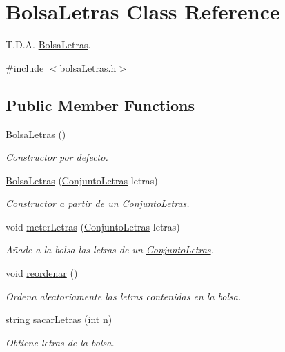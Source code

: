\hypertarget{classBolsaLetras}{}\section{Bolsa\+Letras Class Reference}
\label{classBolsaLetras}


T.\+D.\+A. \mbox{\hyperlink{classBolsaLetras}{Bolsa\+Letras}}.  




{\ttfamily \#include $<$bolsa\+Letras.\+h$>$}

\subsection*{Public Member Functions}
\begin{DoxyCompactItemize}
\item 
\mbox{\label{classBolsaLetras_a2e269014b3a51359195e7b288a4b37c6}} 
\mbox{\hyperlink{classBolsaLetras_a2e269014b3a51359195e7b288a4b37c6}{Bolsa\+Letras}} ()
\begin{DoxyCompactList}\small\item\em Constructor por defecto. \end{DoxyCompactList}\item 
\mbox{\hyperlink{classBolsaLetras_a714c83912cf268e7ee8305eb641bf976}{Bolsa\+Letras}} (\mbox{\hyperlink{classConjuntoLetras}{Conjunto\+Letras}} letras)
\begin{DoxyCompactList}\small\item\em Constructor a partir de un \mbox{\hyperlink{classConjuntoLetras}{Conjunto\+Letras}}. \end{DoxyCompactList}\item 
void \mbox{\hyperlink{classBolsaLetras_ae324c593294fa22e0b4e6f5cc6ecca99}{meter\+Letras}} (\mbox{\hyperlink{classConjuntoLetras}{Conjunto\+Letras}} letras)
\begin{DoxyCompactList}\small\item\em Añade a la bolsa las letras de un \mbox{\hyperlink{classConjuntoLetras}{Conjunto\+Letras}}. \end{DoxyCompactList}\item 
\mbox{\label{classBolsaLetras_a024246bb2bea79846aee3d4d0a7b4362}} 
void \mbox{\hyperlink{classBolsaLetras_a024246bb2bea79846aee3d4d0a7b4362}{reordenar}} ()
\begin{DoxyCompactList}\small\item\em Ordena aleatoriamente las letras contenidas en la bolsa. \end{DoxyCompactList}\item 
string \mbox{\hyperlink{classBolsaLetras_a884c52d85d2ed9c21ffdc62ed218c1fc}{sacar\+Letras}} (int n)
\begin{DoxyCompactList}\small\item\em Obtiene letras de la bolsa. \end{DoxyCompactList}\end{DoxyCompactItemize}


